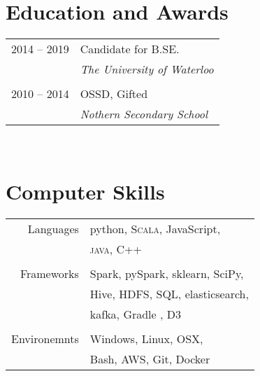 \documentclass[10pt]{article} %
\begin{document}
{\begin{minipage}[t]{0.6\textwidth}
\begin{itemize}[noitemsep, nosep, leftmargin=.5cm]
\end{itemize}



\section{Education and Awards}

\begin{tabular}{rl} %


2014 -- 2019 & Candidate for \textsc{B.SE.} \\
& \large\textit{The University of Waterloo}\\
&\\


2010 -- 2014 & \textsc{OSSD}, Gifted \\
& \large\textit{Nothern Secondary School}
\end{tabular}\\[10pt]



\end{minipage} %
\hfill
\begin{minipage}[t]{0.34\textwidth} %
\vspace{0pt} %



\section{Computer Skills}

\begin{tabular}{rl}
Languages
& python, \textsc{Scala}, JavaScript, \\
& \textsc{java}, C++ \\
& \\
Frameworks
& Spark, pySpark, sklearn, SciPy, \\
& Hive, \textsc{HDFS}, SQL, elasticsearch,\\
& kafka, Gradle , D3 \\
& \\
Environemnts
& Windows, Linux, OSX, \\
& Bash, AWS, Git, Docker
\end{tabular}


\end{minipage}}
\end{document}
